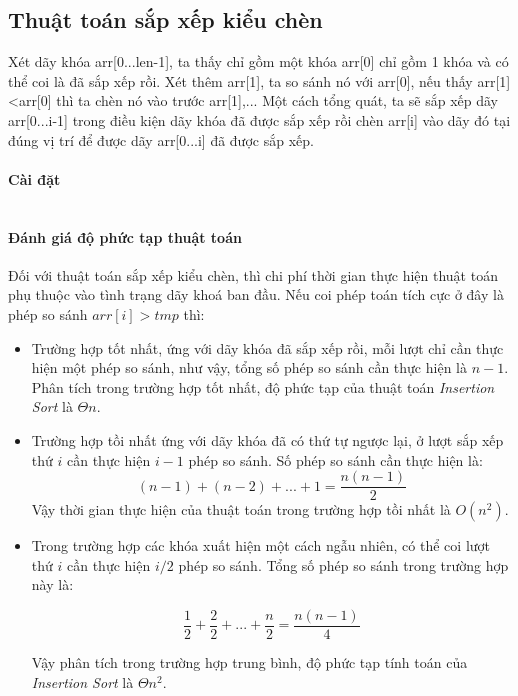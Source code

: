 \documentclass[8pt, a4paper]{article}
\newcommand{\mnt}[1]{\inputminted[frame=single, linenos=true, tabsize=4]{c++}{#1}}
\begin{document}
\subsection{Thuật toán sắp xếp kiểu chèn}

Xét dãy khóa arr[0...len-1], ta thấy chỉ gồm một khóa arr[0] chỉ gồm 1 khóa và có thể coi là đã sắp xếp rồi. Xét thêm arr[1], ta so sánh nó với arr[0], nếu thấy arr[1]<arr[0] thì ta chèn nó vào trước arr[1],... Một cách tổng quát, ta sẽ sắp xếp dãy arr[0...i-1] trong điều kiện dãy khóa đã được sắp xếp rồi chèn arr[i] vào dãy đó tại đúng vị trí để được dãy arr[0...i] đã được sắp xếp.

\paragraph{Cài đặt}
\mnt{src/insertionsort.cpp}

\paragraph{Đánh giá độ phức tạp thuật toán}
Đối với thuật toán sắp xếp kiểu chèn, thì chi phí thời gian thực hiện thuật toán phụ thuộc vào
tình trạng dãy khoá ban đầu. Nếu coi phép toán tích cực ở đây là phép so sánh $arr[i] > tmp$ thì:

\begin{itemize}
\item Trường hợp tốt nhất, ứng với dãy khóa đã sắp xếp rồi, mỗi lượt chỉ cần thực hiện một phép so sánh, như vậy, tổng số phép so sánh cần thực hiện là $n-1$. Phân tích trong trường hợp tốt nhất, độ phức tạp của thuật toán \emph{Insertion Sort} là $\Theta{n}$.
\item Trường hợp tồi nhất ứng với dãy khóa đã có thứ tự ngược lại, ở lượt sắp xếp thứ $i$ cần thực hiện $i-1$ phép so sánh. Số phép so sánh cần thực hiện là:
$$(n-1) + (n-2) + ... +1 = \frac{n(n-1)}{2}$$
Vậy thời gian thực hiện của thuật toán trong trường hợp tồi nhất là $O(n^2)$.
\item Trong trường hợp các khóa xuất hiện một cách ngẫu nhiên, có thể coi lượt thứ $i$ cần thực hiện $i/2$ phép so sánh. Tổng số phép so sánh trong trường hợp này là:

$$\frac{1}{2} + \frac{2}{2} + ... + \frac{n}{2} = \frac{n(n-1)}{4}$$

Vậy phân tích trong trường hợp trung bình, độ phức tạp tính toán của \emph{Insertion Sort} là $\Theta{n^2}$.

\end{itemize}
\end{document}
